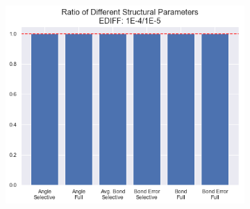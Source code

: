         \begin{figure}
             \centering
             \begin{subfigure}[t]{0.45\textwidth}
                 \centering
                 \includegraphics[width=\textwidth]{Figures/System/ediff_geom_ratios.png}
                 

\end{subfigure}
\end{figure}
